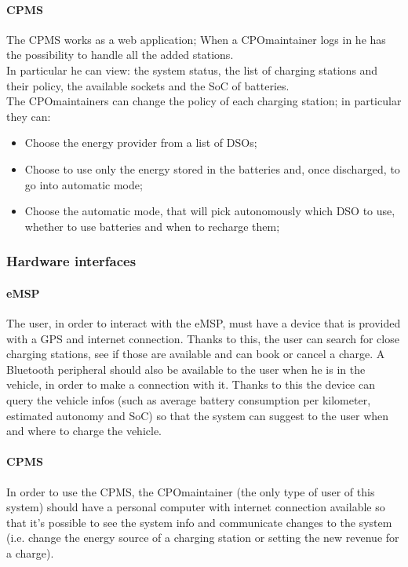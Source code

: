 \paragraph{\ac{CPMS}}
The \ac{CPMS} works as a web application; When a \ac{CPO}maintainer logs in he has the possibility to handle all the added stations.\\
In particular he can view: the system status, the list of charging stations and their policy, the available sockets and the \ac{SoC} of batteries.\\
The \ac{CPO}maintainers can change the policy of each charging station; in particular they can:
\begin{itemize}
    \item Choose the energy provider from a list of \acp{DSO};
    \item Choose to use only the energy stored in the batteries and, once discharged, to go into automatic mode;
    \item Choose the automatic mode, that will pick autonomously which \ac{DSO} to use, whether to use batteries and when to recharge them;
\end{itemize}

\subsubsection{Hardware interfaces}
\paragraph{\ac{eMSP}}
The user, in order to interact with the \ac{eMSP}, must have a device that is provided with a \ac{GPS} and internet connection. Thanks to this, the user can search for close charging stations, see if those are available and can book or cancel a charge.
A Bluetooth peripheral should also be available to the user when he is in the vehicle, in order to make a connection with it. Thanks to this the device can query the vehicle infos (such as average battery consumption per kilometer, estimated autonomy and \ac{SoC}) so that the system can suggest to the user when and where to charge the vehicle.

\paragraph{\ac{CPMS}}
In order to use the \ac{CPMS}, the \ac{CPO}maintainer (the only type of user of this system) should have a personal computer with internet connection available so that it's possible to see the system info and communicate changes to the system (i.e. change the energy source of a charging station or setting the new revenue for a charge).

